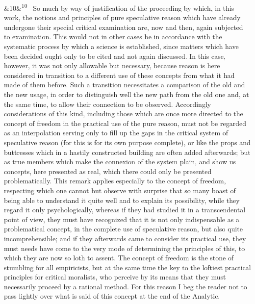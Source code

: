 \documentclass[12pt]{article}
\newcommand{\para}[1][]{\par\noindent\ifx&#1&\else\textsuperscript{\footnotesize #1}~\fi}
\begin{document}
\para[10] So much by way of justification of the proceeding by which, in this work, the notions and principles of pure speculative reason which have already undergone their special critical examination are, now and then, again subjected to examination. This would not in other cases be in accordance with the systematic process by which a science is established, since matters which have been decided ought only to be cited and not again discussed. In this case, however, it was not only allowable but necessary, because reason is here considered in transition to a different use of these concepts from what it had made of them before. Such a transition necessitates a comparison of the old and the new usage, in order to distinguish well the new path from the old one and, at the same time, to allow their connection to be observed. Accordingly considerations of this kind, including those which are once more directed to the concept of freedom in the practical use of the pure reason, must not be regarded as an interpolation serving only to fill up the gaps in the critical system of speculative reason (for this is for its own purpose complete), or like the props and buttresses which in a hastily constructed building are often added afterwards; but as true members which make the connexion of the system plain, and show us concepts, here presented as real, which there could only be presented problematically. This remark applies especially to the concept of freedom, respecting which one cannot but observe with surprise that so many boast of being able to understand it quite well and to explain its possibility, while they regard it only psychologically, whereas if they had studied it in a transcendental point of view, they must have recognized that it is not only indispensable as a problematical concept, in the complete use of speculative reason, but also quite incomprehensible; and if they afterwards came to consider its practical use, they must needs have come to the very mode of determining the principles of this, to which they are now so loth to assent. The concept of freedom is the stone of stumbling for all empiricists, but at the same time the key to the loftiest practical principles for critical moralists, who perceive by its means that they must necessarily proceed by a rational method. For this reason I beg the reader not to pass lightly over what is said of this concept at the end of the Analytic.
\end{document}
